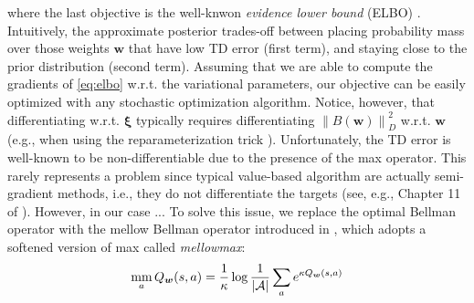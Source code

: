 \documentclass{article}
\newcommand{\mm}{\operatornamewithlimits{mm}}
\newcommand{\norm}[1]{\left\lVert #1 \right\rVert}
\begin{document}
where the last objective is the well-knwon \textit{evidence lower bound} (ELBO) \cite{}. Intuitively, the approximate posterior trades-off between placing probability mass over those weights $\bm{w}$ that have low TD error (first term), and staying close to the prior distribution (second term). Assuming that we are able to compute the gradients of \eqref{eq:elbo} w.r.t. the variational parameters, our objective can be easily optimized with any stochastic optimization algorithm. Notice, however, that differentiating w.r.t. $\bm{\xi}$ typically requires differentiating $\norm{B(\bm{w})}_D^2$ w.r.t. $\bm{w}$ (e.g., when using the reparameterization trick \cite{}). Unfortunately, the TD error is well-known to be non-differentiable due to the presence of the max operator. This rarely represents a problem since typical value-based algorithm are actually semi-gradient methods, i.e., they do not differentiate the targets (see, e.g., Chapter 11 of \cite{}). However, in our case ...  To solve this issue, we replace the optimal Bellman operator with the mellow Bellman operator introduced in \cite{}, which adopts a softened version of max called \textit{mellowmax}:
\begin{equation}
\mm_a Q_{\bm{w}}(s,a) = \frac{1}{\kappa} \log \frac{1}{|\mathcal{A}|}\sum_a e^{\kappa Q_{\bm{w}}(s,a)}
\end{equation}
\end{document}
